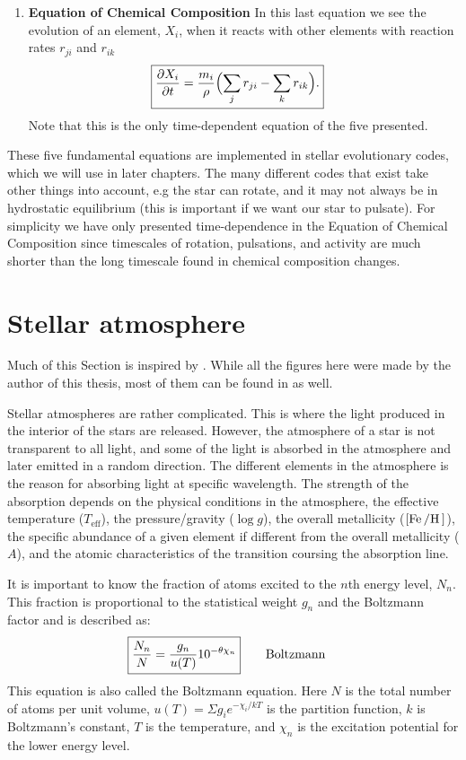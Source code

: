 \begin{enumerate}
    \item \textbf{Equation of Chemical Composition}
        \nicebreak
        In this last equation we see the evolution of an element, $X_i$, when
        it reacts with other elements with reaction rates $r_{ji}$ and $r_{ik}$
        \begin{align}
            \Aboxed{\pd{X_i}{t} &= \frac{m_i}{\rho} \Bigl( \sum_j r_{ji} - \sum_k r_{ik}\Bigr).}
        \end{align}
        Note that this is the only time-dependent equation of the five
        presented.
\end{enumerate}

These five fundamental equations are implemented in stellar evolutionary codes,
which we will use in later chapters. The many different codes that exist take
other things into account, e.g the star can rotate, and it may not always be in
hydrostatic equilibrium (this is important if we want our star to pulsate). For
simplicity we have only presented time-dependence in the Equation of Chemical
Composition since timescales of rotation, pulsations, and activity are much
shorter than the long timescale found in chemical composition changes.


\section{Stellar atmosphere}

Much of this Section is inspired by \citet{Gray2006}. While all the figures here
were made by the author of this thesis, most of them can be found in
\citet{Gray2006} as well.

Stellar atmospheres are rather complicated. This is where the light produced in
the interior of the stars are released. However, the atmosphere of a star is not
transparent to all light, and some of the light is absorbed in the atmosphere
and later emitted in a random direction. The different elements in the
atmosphere is the reason for absorbing light at specific wavelength. The
strength of the absorption depends on the physical conditions in the atmosphere,
the effective temperature ($T_\mathrm{eff}$), the pressure/gravity ($\log g$),
the overall metallicity ($[\ion{Fe}/\ion{H}]$), the specific abundance of a
given element if different from the overall metallicity ($A$), and the atomic
characteristics of the transition coursing the absorption line.

It is important to know the fraction of atoms excited to the $n$th energy level,
$N_n$. This fraction is proportional to the statistical weight $g_n$ and the
Boltzmann factor and is described as:
\begin{align}
    \Aboxed{ \frac{N_n}{N} = \frac{g_n}{u(T)} 10^{-\theta\chi_n}} \tag*{Boltzmann}
\end{align}
This equation is also called the Boltzmann equation. Here $N$ is the total
number of atoms per unit volume, $u(T)=\Sigma g_i e^{-\chi_i/kT}$ is the
partition function, $k$ is Boltzmann's constant, $T$ is the temperature, and
$\chi_n$ is the excitation potential for the lower energy level.

